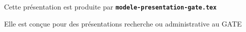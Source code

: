   \item Cette présentation est produite par \texttt{\textbf{modele-presentation-gate.tex}}
  \item Elle est conçue pour des présentations recherche ou administrative au GATE
